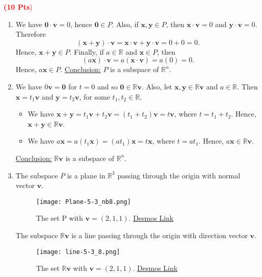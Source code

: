 \documentclass[12pt]{article}
\newcommand{\spc}{\vspace*{0.5cm}}
\newcommand{\exo}[3]{\noindent\textcolor{red}{\fbox{\textbf{Section {#1} | Problem {#2}}}\hrulefill   \textbf{({#3} Pts})}\vspace*{10pt}}
\begin{document}
\spc 

\exo{5.3}{8}{10}

	\begin{enumerate}[label=\alph*.]
		\item We have $\mathbf{0} \cdot \mathbf{v} = 0$, hence $\mathbf{0} \in P$. Also, if $\mathbf{x} , \mathbf{y} \in P$, then $\mathbf{x} \cdot \mathbf{v} = 0$ and $\mathbf{y} \cdot \mathbf{v} = 0$. Therefore
			\[
				(\mathbf{x} + \mathbf{y} ) \cdot \mathbf{v} = \mathbf{x} \cdot \mathbf{v} + \mathbf{y} \cdot \mathbf{v} = 0 + 0 = 0 .
			\]
		Hence, $\mathbf{x} + \mathbf{y} \in P$. Finally, if $a \in \mathbb{R}$ and $\mathbf{x} \in P$, then
			\[
				(a \mathbf{x}) \cdot \mathbf{v} = a (\mathbf{x} \cdot \mathbf{v} ) = a (0) = 0 .
			\]
		Hence, $a \mathbf{x} \in P$. \underline{Conclusion:} $P$ is a subspace of $\mathbb{R}^n$.
		\item We have $0 \mathbf{v} = \mathbf{0}$ for $t = 0$ and so $\mathbf{0} \in \mathbb{R} \mathbf{v}$. Also, let $\mathbf{x} , \mathbf{y} \in \mathbb{R} \mathbf{v}$ and $a \in \mathbb{R}$. Then $\mathbf{x} = t_1 \mathbf{v}$ and $\mathbf{y} = t_2 \mathbf{v}$, for some $t_1 , t_2 \in \mathbb{R}$. 
			\begin{itemize}
				\item We have $\mathbf{x} + \mathbf{y} = t_1 \mathbf{v} + t_2 \mathbf{v} = (t_1 + t_2 ) \mathbf{v} = t \mathbf{v}$, where $t = t_1 + t_2$. Hence, $\mathbf{x} + \mathbf{y} \in \mathbb{R} \mathbf{v}$.
				\item We have $a \mathbf{x} = a (t_1 \mathbf{x}) = (at_1) \mathbf{x} = t \mathbf{x}$, where $t = a t_1$. Hence, $a \mathbf{x} \in \mathbb{R} \mathbf{v}$. 
			\end{itemize}
		\underline{Conclusion:} $\mathbb{R} \mathbf{v}$ is a subspace of $\mathbb{R}^n$.
		\item The subspace $P$ is a plane in $\mathbb{R}^3$ passing through the origin with normal vector $\mathbf{v}$. 
			\begin{figure}[ht]
				\centering 
				\texttt{[image: Plane-5-3\_nb8.png]}
				\caption{The set P with $\mathbf{v} = (2, 1, 1)$. \href{https://www.desmos.com/3d/mboosgbu5z}{Desmos Link}}
			\end{figure}

			The subspace $\mathbb{R} \mathbf{v}$ is a line passing through the origin with direction vector $\mathbf{v}$.
				\begin{figure}[ht]
					\centering 
					\texttt{[image: line-5-3\_8.png]}
					\caption{The set $\mathbb{R} \mathbf{v}$ with $\mathbf{v} = (2, 1, 1)$. \href{https://www.desmos.com/3d/9zllupdlor}{Desmos Link}}
				\end{figure}

	\end{enumerate}
\end{document}
